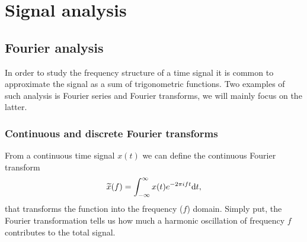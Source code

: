 \chapter{Signal analysis}
\section{Fourier analysis}
In order to study the frequency structure of a time signal it is common 
to approximate the signal as a sum of trigonometric functions. Two examples
of such analysis is Fourier series and Fourier transforms, we will mainly
focus on the latter.
\subsection{Continuous and discrete Fourier transforms}
From a continuous time signal $x(t)$ we can define the continuous Fourier transform  
\begin{equation} \label{eqSA:cf}
\widetilde{x}(f) = \int_{-\infty}^{\infty} x(t) e^{-2 \pi i f t} \mathrm{d} t, 
\end{equation}
that transforms the function into the frequency ($f$) domain.
Simply put, the Fourier transformation tells us how much a harmonic oscillation 
of frequency $f$ contributes to the total signal. 

